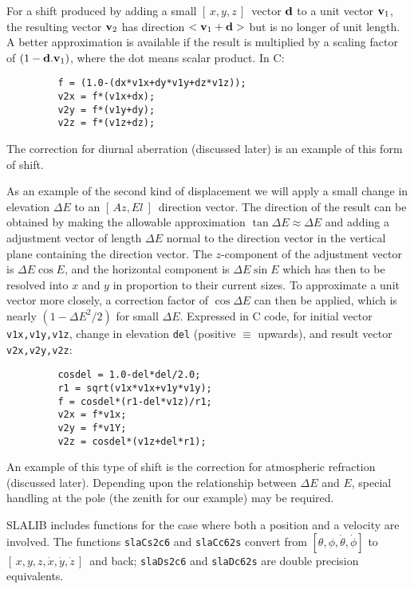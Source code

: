 \documentclass[11pt,fleqn,twoside]{article}
\renewcommand{\_}{{\tt\char'137}}     %
\newcommand{\azel}      {$[\,Az,El~]$}
\newcommand{\xyz}       {$[\,x,y,z\,]$}
\newcommand{\xyzxyzd}   {$[\,x,y,z,\dot{x},\dot{y},\dot{z}\,]$}
\begin{document}
For a shift produced by adding a small \xyz\ vector ${\bf d}$ to a
unit vector ${\bf v}_1$, the resulting vector ${\bf v}_2$ has direction
$<{\bf v}_1+{\bf d}>$ but is no longer of unit length.  A better approximation
is available if the result is multiplied by a scaling factor of
$(1-{\bf d}.{\bf v}_1)$, where the dot
means scalar product.  In C:
\goodbreak
\vspace{-3ex}
\begin{verbatim}
         f = (1.0-(dx*v1x+dy*v1y+dz*v1z));
         v2x = f*(v1x+dx);
         v2y = f*(v1y+dy);
         v2z = f*(v1z+dz);
\end{verbatim}
\vspace{-3ex}
\goodbreak
The correction for diurnal aberration (discussed later) is
an example of this form of shift.

As an example of the second kind of displacement
we will apply a small change in elevation $\Delta E$ to an
\azel\ direction vector.  The direction of the
result can be obtained by making the allowable approximation
${\tan \Delta E\approx\Delta E}$ and adding a adjustment
vector of length $\Delta E$ normal
to the direction vector in the vertical plane containing the direction
vector.  The $z$-component of the adjustment vector is
$\Delta E \cos E$,
and the horizontal component is
$\Delta E \sin E$ which has then to be
resolved into $x$ and $y$ in proportion to their current sizes. To
approximate a unit vector more closely, a correction factor of
$\cos \Delta E$ can then be applied, which is nearly
$(1-\Delta E^2 /2)$ for
small $\Delta E$.  Expressed in C code, for initial vector
{\tt v1x,v1y,v1z}, change in elevation {\tt del}
(positive $\equiv$ upwards), and result
vector {\tt v2x,v2y,v2z}:
\goodbreak
\vspace{-3ex}
\begin{verbatim}
         cosdel = 1.0-del*del/2.0;
         r1 = sqrt(v1x*v1x+v1y*v1y);
         f = cosdel*(r1-del*v1z)/r1;
         v2x = f*v1x;
         v2y = f*v1Y;
         v2z = cosdel*(v1z+del*r1);
\end{verbatim}
\vspace{-3ex}
\goodbreak
An example of this type of shift is the correction for atmospheric
refraction (discussed later).
Depending upon the relationship between $\Delta E$ and $E$, special
handling at the pole (the zenith for our example) may be required.

SLALIB includes functions for the case where both a position
and a velocity are involved.  The functions
{\tt slaCs2c6}
and
{\tt slaCc62s}
convert from $[\theta,\phi,\dot{\theta},\dot{\phi}]$
to \xyzxyzd\ and back;
{\tt slaDs2c6}
and
{\tt slaDc62s}
are double precision equivalents.
\end{document}
